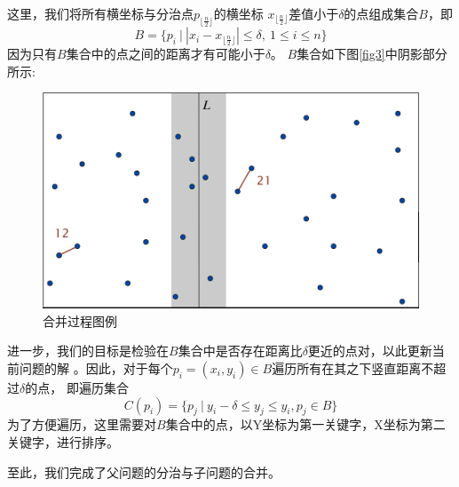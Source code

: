 这里，我们将所有横坐标与分治点$p_{\lfloor\frac{n}{2}\rfloor}$的横坐标
$x_{\lfloor\frac{n}{2}\rfloor}$差值小于$\delta$的点组成集合$B$，即
\begin{equation*}
    B = \{p_i\ \big|\ 
        \left|x_i - x_{\lfloor\frac{n}{2}\rfloor}\right| \le \delta ,\
        1 \le i \le n\}
\end{equation*}   
因为只有$B$集合中的点之间的距离才有可能小于$\delta$。
$B$集合如下图\autoref{fig3}中阴影部分所示:
\begin{figure}[htb]
    \centering
    \includegraphics[scale=0.5]{Ln9.image/NearestPointsMerge.png}
    \caption{合并过程图例}\label{fig3}
\end{figure}

进一步，我们的目标是检验在$B$集合中是否存在距离比$\delta$更近的点对，以此更新当前问题的解
。因此，对于每个$p_i = (x_i, y_i) \in B$遍历所有在其之下竖直距离不超过$\delta$的点，
即遍历集合
\begin{equation*}
    C(p_i) = \{ p_j\ \big|\ y_i - \delta \le y_j \le y_i, p_j \in B \}
\end{equation*}
为了方便遍历，这里需要对$B$集合中的点，以Y坐标为第一关键字，X坐标为第二关键字，进行排序。

至此，我们完成了父问题的分治与子问题的合并。

